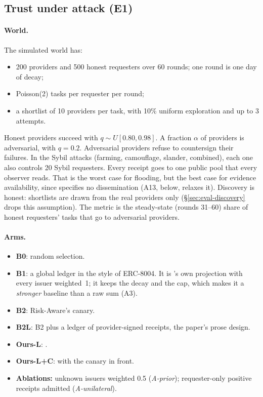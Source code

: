 \subsection{Trust under attack (E1)}
\label{sec:eval-trust}

\paragraph{World.}
The simulated world has:
\begin{itemize}
\item 200 providers and 500 honest requesters over 60 rounds; one round
  is one day of decay;
\item Poisson(2) tasks per requester per round;
\item a shortlist of 10 providers per task, with 10\% uniform
  exploration and up to 3 attempts.
\end{itemize}
Honest providers succeed with $q\sim U[0.80,0.98]$. A fraction $\alpha$
of providers is adversarial, with $q{=}0.2$. Adversarial providers refuse
to countersign their failures. In the Sybil attacks (farming, camouflage,
slander, combined), each one also controls 20 Sybil requesters.
Every receipt goes to one public pool that every observer reads. That is
the worst case for flooding, but the best case for evidence
availability, since \sys{} specifies no dissemination (A13, below, relaxes
it). Discovery is
honest: shortlists are drawn from the real providers only
(\S\ref{sec:eval-discovery} drops this assumption). The metric is the
steady-state (rounds 31--60) share of honest requesters' tasks that go to
adversarial providers.

\paragraph{Arms.}
\begin{itemize}
\item \textbf{B0}: random selection.
\item \textbf{B1}: a global ledger in the style of ERC-8004. It is
  \sys{}'s own projection with every issuer weighted~1; it keeps the
  decay and the cap, which makes it a \emph{stronger} baseline than a raw
  sum (A3).
\item \textbf{B2}: Risk-Aware's canary.
\item \textbf{B2L}: B2 plus a ledger of provider-signed receipts, the
  paper's prose design.
\item \textbf{Ours-L}: \sys{}.
\item \textbf{Ours-L+C}: \sys{} with the canary in front.
\item \textbf{Ablations:} unknown issuers weighted 0.5
  (\emph{A-prior}); requester-only positive receipts admitted
  (\emph{A-unilateral}).
\end{itemize}

